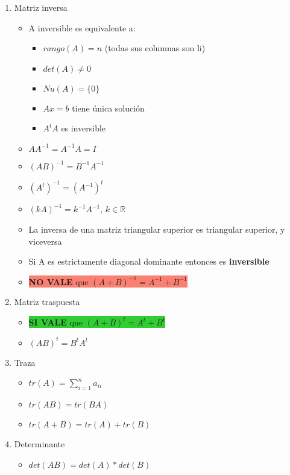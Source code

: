 \begin{enumerate}
\begin{itemize}
    \end{itemize}    
    
    \item Matriz inversa
    \begin{itemize}
    \item A inversible es equivalente a:
        \begin{itemize}
        \item $rango(A) = n$ (todas sus columnas son li)
        \item $det(A)\neq0$
        \item $Nu(A) = \{0\}$
        \item $Ax=b$ tiene única solución
        \item $A^tA$ es inversible
        \end{itemize}
    \item $AA^{-1} = A^{-1}A = I$
    \item $(AB)^{-1} = B^{-1}A^{-1}$
    \item $(A^t)^{-1} = (A^{-1})^t$
    \item $(kA)^{-1} = k^{-1} A^{-1}$, $k\in\mathbb{R}$
    \item La inversa de una matriz triangular superior es triangular \colorbox{Dandelion}{superior}, y viceversa
    \item \colorbox{Dandelion}{Si A es estrictamente diagonal dominante entonces es \textbf{inversible}}
    \item \colorbox{Salmon}{\textbf{NO VALE} que $(A+B)^{-1} = A^{-1} + B^{-1}$}
    \end{itemize}
    \item Matriz traspuesta
    \begin{itemize}
        \item \colorbox{LimeGreen}{\textbf{SI VALE} que $(A+B)^t = A^t + B^t$}
        \item $(AB)^t = B^tA^t$
    \end{itemize}
    \item Traza
    \begin{itemize}
        \item $tr(A) = \sum_{i=1}^{n}a_{ii}$ 
    \item $tr(AB) = tr(BA)$
    \item $tr(A+B) = tr(A)+tr(B)$
    \end{itemize}
    \item Determinante
    \begin{itemize}
        \item $det(AB) = det(A)*det(B)$

\end{itemize}
\end{enumerate}
